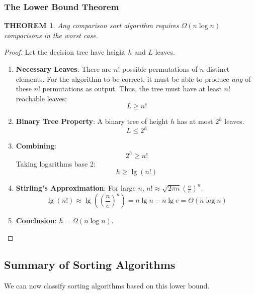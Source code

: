 \documentclass[12pt]{article}
\theoremstyle{blueplain}
\newtheorem{theorem}{THEOREM}[section]
\theoremstyle{bluedef}
\theoremstyle{blueremark}
\begin{document}
\subsubsection{The Lower Bound Theorem}
\begin{theorem}
    Any comparison sort algorithm requires $\Omega(n \log n)$ comparisons in the worst case.
\end{theorem}
\begin{proof}
    Let the decision tree have height $h$ and $L$ leaves.
    \begin{enumerate}
        \item \textbf{Necessary Leaves}: There are $n!$ possible permutations of $n$ distinct elements. For the algorithm to be correct, it must be able to produce \textit{any} of these $n!$ permutations as output. Thus, the tree must have at least $n!$ reachable leaves:
              \[ L \ge n! \]
        \item \textbf{Binary Tree Property}: A binary tree of height $h$ has at most $2^h$ leaves.
              \[ L \le 2^h \]
        \item \textbf{Combining}:
              \[ 2^h \ge n! \]
              Taking logarithms base 2:
              \[ h \ge \lg(n!) \]
        \item \textbf{Stirling's Approximation}: For large $n$, $n! \approx \sqrt{2\pi n} (\frac{n}{e})^n$.
              \[ \lg(n!) \approx \lg\left(\left(\frac{n}{e}\right)^n\right) = n \lg n - n \lg e = \Theta(n \log n) \]
        \item \textbf{Conclusion}: $h = \Omega(n \log n)$.
    \end{enumerate}
\end{proof}

\subsection{Summary of Sorting Algorithms}

We can now classify sorting algorithms based on this lower bound.
\end{document}
